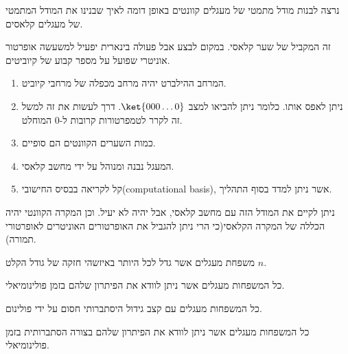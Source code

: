 \documentclass{tstextbook}
\begin{document}
נרצה לבנות מודל מתמטי של מעגלים קוונטים באופן דומה לאיך שבנינו את המודל המתמטי של מעגלים קלאסים.

\begin{proposition}
זה המקביל של שער קלאסי. במקום לבצע אבל פעולה בינארית יפעיל למשעשה אופרטור אוניטרי שפועל על מספר קבוע של קיוביטים. 

\end{proposition}
\begin{definition}
  \begin{enumerate}
    \item המרחב ההילברט יהיה מרחב מכפלה של מרחבי קיוביט. 


    \item ניתן לאפס אותו. כלומר ניתן להביאו למצב \(\ket{000\dots 0}\). דרך לעשות את זה למשל זה לקרר לטמפרטורות קרובות ל-0 המוחלט. 


    \item כמות השערים הקוונטים הם סופיים. 


    \item המעגל נבנה ומנוהל על ידי מחשב קלאסי. 


    \item קל לקריאה בבסיס החישובי(computational basis), אשר ניתן למדד בסוף התהליך. 


  \end{enumerate}
\end{definition}
\begin{remark}
ניתן לקיים את המודל הזה עם מחשב קלאסי, אבל יהיה לא יעיל. וכן המקרה הקוונטי יהיה הכללה של המקרה הקלאסי(כי הרי ניתן להגביל את האופרטורים האוניטרים לאופרטורי תמורה).

\end{remark}
\begin{definition}[מחלקת P]
משפחת מעגלים אשר גדל לכל היותר באיזשהי חזקה של גודל הקלט \(n\).

\end{definition}
\begin{definition}[מחלקת NP]
כל המשפחות מעגלים אשר ניתן לוודא את הפיתרון שלהם בזמן פולינומיאלי.

\end{definition}
\begin{definition}
כל המשפחות מעגלים עם קצב גידול היסתברותי חסום על ידי פולינום.

\end{definition}
\begin{definition}[מחלקת MA]
כל המשפחות מעגלים אשר ניתן לוודא את הפיתרון שלהם בצורה הסתברותית בזמן פולינומיאלי.

\end{definition}
\end{document}
